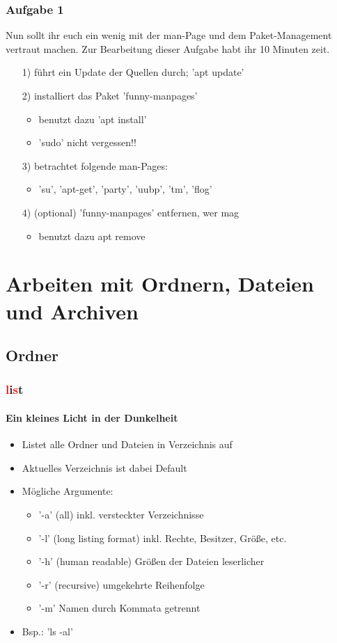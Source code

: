 \documentclass[12pt,utf8]{beamer}
\begin{document}
\begin{frame}
\frametitle{Aufgabe 1}
Nun sollt ihr euch ein wenig mit der man-Page und dem Paket-Management vertraut machen. Zur Bearbeitung dieser Aufgabe habt ihr 10 Minuten zeit.
\begin{itemize}
	\item[1)] führt ein Update der Quellen durch; 'apt update'
	\item[2)] installiert das Paket 'funny-manpages'
	\begin{itemize}
		\item benutzt dazu 'apt install'
		\item 'sudo' nicht vergessen!!
	\end{itemize}
	\item[3)] betrachtet folgende man-Pages:
	\begin{itemize}
		\item 'su', 'apt-get', 'party', 'uubp', 'tm', 'flog'
	\end{itemize}
	\item[4)] (optional) 'funny-manpages' entfernen, wer mag
	\begin{itemize}
		\item benutzt dazu apt remove
	\end{itemize}
\end{itemize} 
\end{frame}

\section{Arbeiten mit Ordnern, Dateien und Archiven}
\subsection{Ordner}
\begin{frame}
\frametitle{\textcolor{red}{l}i\textcolor{red}{s}t}
\framesubtitle{Ein kleines Licht in der Dunkelheit}
\begin{itemize}
	\item Listet alle Ordner und Dateien in Verzeichnis auf
	\item Aktuelles Verzeichnis ist dabei Default
	\item Mögliche Argumente:
	\begin{itemize}[<+->]
		\item '-a'  (all) inkl. versteckter Verzeichnisse
		\item '-l'  (long listing format) inkl. Rechte, Besitzer, Größe, etc.
		\item '-h'  (human readable) Größen der Dateien leserlicher
		\item '-r'  (recursive) umgekehrte Reihenfolge
		\item '-m'  Namen durch Kommata getrennt
	\end{itemize}
	\item Bsp.: 'ls -al'
\end{itemize}
\end{frame}
\end{document}
